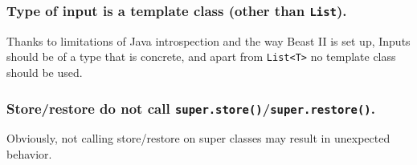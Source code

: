 \documentclass{article}
\begin{document}
\subsubsection{Type of input is a template class (other than {\tt List}).}

Thanks to limitations of Java introspection and the way Beast II is set up, Inputs should be 
of a type that is concrete, and apart from {\tt List<T>} no template class should be used.

\subsubsection{Store/restore do not call {\tt super.store()}/{\tt super.restore()}.}

Obviously, not calling store/restore on super classes may result in unexpected behavior.
\end{document}
